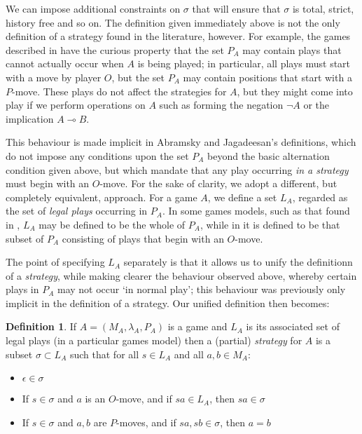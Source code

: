 \documentclass[11pt]{article} %
\theoremstyle{plain} %
\theoremstyle{definition} %
\newtheorem{definition}[theorem]{Definition}
\theoremstyle{exercisestyle}
\renewcommand{\implies}{\multimap}
\newcommand{\emptyplay}{\epsilon}
\begin{document}
We can impose additional constraints on $\sigma$ that will ensure that $\sigma$ is total, strict, history free and so on.  The definition given immediately above is not the only definition of a strategy found in the literature, however.  For example, the games described in \cite{abramskyjagadeesangames} have the curious property that the set $P_A$ may contain plays that cannot actually occur when $A$ is being played; in particular, all plays must start with a move by player $O$, but the set $P_A$ may contain positions that start with a $P$-move.  These plays do not affect the strategies for $A$, but they might come into play if we perform operations on $A$ such as forming the negation $\neg A$ or the implication $A\implies B$.  

This behaviour is made implicit in Abramsky and Jagadeesan's definitions, which do not impose any conditions upon the set $P_A$ beyond the basic alternation condition given above, but which mandate that any play occurring \emph{in a strategy} must begin with an $O$-move.  For the sake of clarity, we adopt a different, but completely equivalent, approach.  For a game $A$, we define a set $L_A$, regarded as the set of \emph{legal plays} occurring in $P_A$.  In some games models, such as that found in \cite{blassgames}, $L_A$ may be defined to be the whole of $P_A$, while in \cite{abramskyjagadeesangames} it is defined to be that subset of $P_A$ consisting of plays that begin with an $O$-move.

The point of specifying $L_A$ separately is that it allows us to unify the definitionn of a \emph{strategy}, while making clearer the behaviour observed above, whereby certain plays in $P_A$ may not occur `in normal play'; this behaviour was previously only implicit in the definition of a strategy.  Our unified definition then becomes:

\begin{definition}
  If $A=(M_A,\lambda_A,P_A)$ is a game and $L_A$ is its associated set of legal plays (in a particular games model) then a (partial) \emph{strategy} for $A$ is a subset $\sigma\subset L_A$ such that for all $s\in L_A$ and all $a, b\in M_A$:
  \begin{itemize}
    \item $\emptyplay\in\sigma$
    \item If $s\in\sigma$ and $a$ is an $O$-move, and if $sa\in L_A$, then $sa\in\sigma$
    \item If $s\in\sigma$ and $a,b$ are $P$-moves, and if $sa,sb\in\sigma$, then $a=b$
  \end{itemize}
\end{definition}
\end{document}
